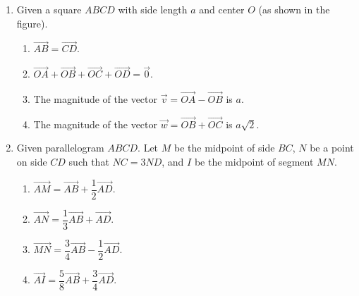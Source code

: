 \documentclass[10pt,a4paper]{article}
\begin{document}
\begin{enumerate}
\item Given a square $ABCD$ with side length $a$ and center $O$ (as shown in the figure).
\par\noindent\begin{minipage}[t]{0.72\linewidth}
\begin{enumerate}
    \item $\vec{AB} = \vec{CD}$.
    \item $\vec{OA} + \vec{OB} + \vec{OC} + \vec{OD} = \vec{0}$.
    \item The magnitude of the vector $\vec{v} = \vec{OA} - \vec{OB}$ is $a$.
    \item The magnitude of the vector $\vec{w} = \vec{OB} + \vec{OC}$ is $a\sqrt{2}$.
\end{enumerate}
\end{minipage}\hfill
\begin{minipage}[t]{0.26\linewidth}\raggedleft\vspace{-6pt}
\end{minipage}

\item Given parallelogram $ABCD$. Let $M$ be the midpoint of side $BC$, $N$ be a point on side $CD$ such that $NC = 3ND$, and $I$ be the midpoint of segment $MN$.
\begin{enumerate}
    \item $\vec{AM} = \vec{AB} + \dfrac{1}{2}\vec{AD}$.
    \item $\vec{AN} = \dfrac{1}{3}\vec{AB} + \vec{AD}$.
    \item $\vec{MN} = \dfrac{3}{4}\vec{AB} - \dfrac{1}{2}\vec{AD}$.
    \item $\vec{AI} = \dfrac{5}{8}\vec{AB} + \dfrac{3}{4}\vec{AD}$.
\end{enumerate}


\end{enumerate}
\end{document}

